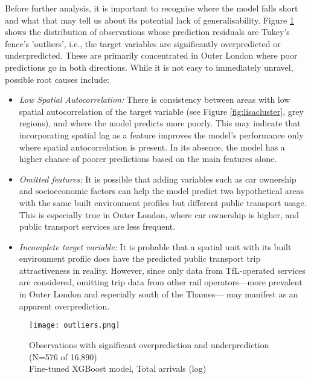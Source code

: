 Before further analysis, it is important to recognise where the model falls short and what that may tell us about its potential lack of generalisability. Figure \ref{fig:outliers} shows the distribution of observations whose prediction residuals are Tukey's fence's 'outliers', i.e., the target variables are significantly overpredicted or underpredicted. These are primarily concentrated in Outer London where poor predictions go in both directions. While it is not easy to immediately unravel, possible root causes include: 

\begin{itemize}
    \setlength\itemsep{0em}
    \item \textit{Low Spatial Autocorrelation:} There is consistency between areas with low spatial autocorrelation of the target variable (see Figure \ref{fig:lisacluster}, grey regions), and where the model predicts more poorly. This may indicate that incorporating spatial lag as a feature improves the model's performance only where spatial autocorrelation is present. In its absence, the model has a higher chance of poorer predictions based on the main features alone.
    \item \textit{Omitted features:} It is possible that adding variables such as car ownership and socioeconomic factors can help the model predict two hypothetical areas with the same built environment profiles but different public transport usage. This is especially true in Outer London, where car ownership is higher, and public transport services are less frequent.
    \item \textit{Incomplete target variable:} It is probable that a spatial unit with its built environment profile does have the predicted public transport trip attractiveness in reality. However, since only data from TfL-operated services are considered, omitting trip data from other rail operators---more prevalent in Outer London and especially south of the Thames--- may manifest as an apparent overprediction. 
\end{itemize}

\begin{figure}[hbt]
    \centering
    \texttt{[image: outliers.png]}
    \captionsetup{justification=centering}
    \caption{Observations with significant overprediction and underprediction (N=576 of 16,890)\\Fine-tuned XGBoost model, Total arrivals (log)}
    \label{fig:outliers}
\end{figure}

